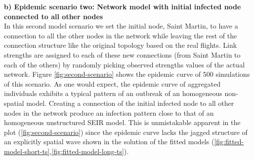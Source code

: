 \documentclass[10pt,a4paper]{article}
\begin{document}
\textbf{b) Epidemic scenario two: Network model with initial infected node connected to all other nodes}\\
%
In this second model scenario we set the initial node, Saint Martin, to have a connection to all the other nodes in the network  while leaving the rest of the connection structure like the original topology based on the real flights. 
%
Link strengths are assigned to each of these new connections (from Saint Martin to each of the others) by randomly picking observed strengths values of the actual network. 
%
Figure \ref{fig:second-scenario} shows the epidemic curve of 500 simulations of this scenario. 
%
As one would expect, the epidemic curve of aggregated individuals exhibits a typical pattern of an outbreak of an homogeneous non-spatial model. Creating a connection of the initial infected node to all other nodes in the network produce an infection pattern close to that of an homogeneous unstructured SEIR model. This is unmistakable apparent in the plot (\ref{fig:second-scenario}) since the epidemic curve lacks the jagged structure of an explicitly spatial wave shown in the solution of the fitted models (\ref{fig:fitted-model-short-ts},\ref{fig:fitted-model-long-ts}). 
\end{document}
